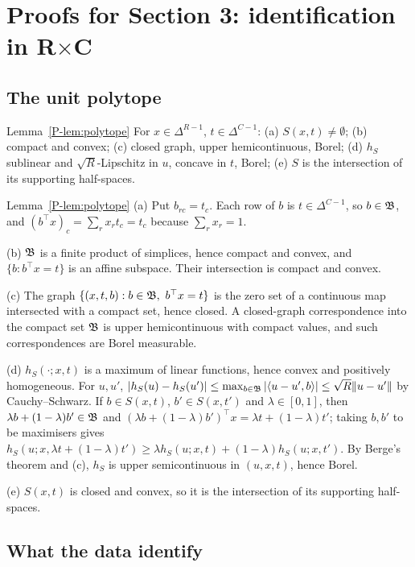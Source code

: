 \section{Proofs for Section 3: identification in \texorpdfstring{R$\times$C}{RxC}}\label{sec:proofs-rxc}

\subsection{The unit polytope}

\begin{restate}{Lemma~\ref{P-lem:polytope}}
For $x\in\Delta^{R-1}$, $t\in\Delta^{C-1}$: (a) $S(x,t)\ne\emptyset$; (b) compact and
convex; (c) closed graph, upper hemicontinuous, Borel; (d) $h_S$ sublinear and
$\sqrt R$-Lipschitz in $u$, concave in $t$, Borel; (e) $S$ is the intersection of
its supporting half-spaces.
\end{restate}
\begin{proofof}{Lemma~\ref{P-lem:polytope}}
(a) Put $b_{rc}=t_c$. Each row of $b$ is $t\in\Delta^{C-1}$, so $b\in\mathfrak B$, and
$(b^\top x)_c=\sum_rx_rt_c=t_c$ because $\sum_rx_r=1$.

(b) $\mathfrak B$ is a finite product of simplices, hence compact and convex, and
$\{b:b^\top x=t\}$ is an affine subspace. Their intersection is compact and convex.

(c) The graph $\{(x,t,b):b\in\mathfrak B,\ b^\top x=t\}$ is the zero set of a continuous
map intersected with a compact set, hence closed. A closed-graph correspondence
into the compact set $\mathfrak B$ is upper hemicontinuous with compact values, and such
correspondences are Borel measurable.

(d) $h_S(\cdot;x,t)$ is a maximum of linear functions, hence convex and positively
homogeneous. For $u,u'$, $|h_S(u)-h_S(u')|\le\max_{b\in\mathfrak B}|\langle u-u',b\rangle|
\le\sqrt R\|u-u'\|$ by Cauchy--Schwarz. If $b\in S(x,t)$, $b'\in S(x,t')$ and
$\lambda\in[0,1]$, then $\lambda b+(1-\lambda)b'\in\mathfrak B$ and
$(\lambda b+(1-\lambda)b')^\top x=\lambda t+(1-\lambda)t'$; taking $b,b'$ to be
maximisers gives $h_S(u;x,\lambda t+(1-\lambda)t')\ge\lambda h_S(u;x,t)+(1-\lambda)h_S(u;x,t')$.
By Berge's theorem and (c), $h_S$ is upper semicontinuous in $(u,x,t)$, hence Borel.

(e) $S(x,t)$ is closed and convex, so it is the intersection of its supporting
half-spaces.
\end{proofof}

\subsection{What the data identify}

